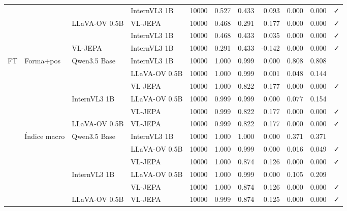 \begin{tabular}{llllrrrrrrl}
 &  &  & InternVL3 1B & 10000 & 0.527 & 0.433 & 0.093 & 0.000 & 0.000 & ✓ \\
\cline{3-11}
 &  & \multirow[t]{2}{*}{LLaVA-OV 0.5B} & VL-JEPA & 10000 & 0.468 & 0.291 & 0.177 & 0.000 & 0.000 & ✓ \\
 &  &  & InternVL3 1B & 10000 & 0.468 & 0.433 & 0.035 & 0.000 & 0.000 & ✓ \\
\cline{3-11}
 &  & VL-JEPA & InternVL3 1B & 10000 & 0.291 & 0.433 & -0.142 & 0.000 & 0.000 & ✓ \\
\cline{1-11} \cline{2-11} \cline{3-11}
\multirow[t]{12}{*}{FT} & \multirow[t]{6}{*}{Forma+pos} & \multirow[t]{3}{*}{Qwen3.5 Base} & InternVL3 1B & 10000 & 1.000 & 0.999 & 0.000 & 0.808 & 0.808 &  \\
 &  &  & LLaVA-OV 0.5B & 10000 & 1.000 & 0.999 & 0.001 & 0.048 & 0.144 &  \\
 &  &  & VL-JEPA & 10000 & 1.000 & 0.822 & 0.177 & 0.000 & 0.000 & ✓ \\
\cline{3-11}
 &  & \multirow[t]{2}{*}{InternVL3 1B} & LLaVA-OV 0.5B & 10000 & 0.999 & 0.999 & 0.000 & 0.077 & 0.154 &  \\
 &  &  & VL-JEPA & 10000 & 0.999 & 0.822 & 0.177 & 0.000 & 0.000 & ✓ \\
\cline{3-11}
 &  & LLaVA-OV 0.5B & VL-JEPA & 10000 & 0.999 & 0.822 & 0.177 & 0.000 & 0.000 & ✓ \\
\cline{2-11} \cline{3-11}
 & \multirow[t]{6}{*}{Índice macro} & \multirow[t]{3}{*}{Qwen3.5 Base} & InternVL3 1B & 10000 & 1.000 & 1.000 & 0.000 & 0.371 & 0.371 &  \\
 &  &  & LLaVA-OV 0.5B & 10000 & 1.000 & 0.999 & 0.000 & 0.016 & 0.049 & ✓ \\
 &  &  & VL-JEPA & 10000 & 1.000 & 0.874 & 0.126 & 0.000 & 0.000 & ✓ \\
\cline{3-11}
 &  & \multirow[t]{2}{*}{InternVL3 1B} & LLaVA-OV 0.5B & 10000 & 1.000 & 0.999 & 0.000 & 0.105 & 0.209 &  \\
 &  &  & VL-JEPA & 10000 & 1.000 & 0.874 & 0.126 & 0.000 & 0.000 & ✓ \\
\cline{3-11}
 &  & LLaVA-OV 0.5B & VL-JEPA & 10000 & 0.999 & 0.874 & 0.125 & 0.000 & 0.000 & ✓ \\
\cline{1-11} \cline{2-11} \cline{3-11}
\bottomrule
\end{tabular}
